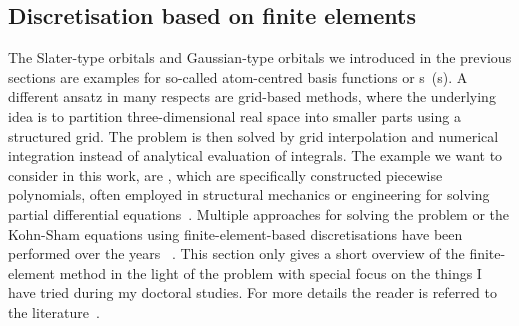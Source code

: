 \subsection{Discretisation based on finite elements}
\label{sec:FE}
\newcommand{\Nquadc}{\ensuremath N_\text{quadc}}
\newcommand{\Ncell}{\ensuremath N_\text{cell}}

The Slater-type orbitals and Gaussian-type orbitals
we introduced in the previous sections
are examples for so-called atom-centred basis functions
or s~({\AO}s).
A different ansatz in many respects
are grid-based methods,
where the underlying idea is to partition three-dimensional real space
into smaller parts using a structured grid.
The problem is then solved by grid interpolation and numerical integration
instead of analytical evaluation of integrals.
The example we want to consider in this work, are ,
which are specifically constructed piecewise polynomials,
often employed in structural mechanics or engineering
for solving partial differential equations~\cite{Johnson1987}.
Multiple approaches for
solving the \HF problem or the Kohn-Sham equations
using finite-element-based discretisations
have been performed over the years%
~\cite{Tsuchida1995,Soler2002,Lehtovaara2009,Alizadegan2010,Avery2011PhD,Davydov2015,Lee2015,Boffi2016}.
This section only gives a short overview of the finite-element method
in the light of the \HF problem
with special focus on the things I have tried during my doctoral studies.
For more details the reader is referred
to the literature~\cite{Johnson1987,Grossmann1992,Bangerth2003,Brenner2008}.

